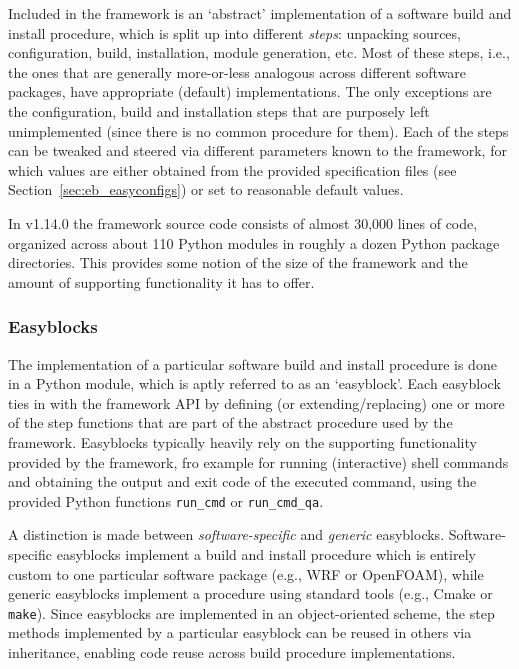 Included in the framework is an `abstract' implementation of a software build and
install procedure, which is split up into different \emph{steps}: unpacking sources,
configuration, build, installation, module generation, etc. Most of these steps,
i.e., the ones that are generally more-or-less analogous across
different software packages, have appropriate (default) implementations. The only
exceptions are the configuration, build and installation steps that are purposely
left unimplemented (since there is no common procedure for them). Each of the steps
can be tweaked and steered via different parameters known to the framework, for
which values are either obtained from the provided specification files (see
Section~\ref{sec:eb_easyconfigs}) or set to reasonable default values.

In \easybuild{} v1.14.0 the framework source code consists of almost 30,000 lines
of code, organized across about 110 Python modules in roughly a dozen Python
package directories. This provides some notion of the size of the \easybuild{}
framework and the amount of supporting functionality it has to offer.

\subsubsection{Easyblocks}
\label{sec:eb_easyblocks}

The implementation of a particular software build and install procedure is done in
a Python module, which is aptly referred to as an `easyblock'. Each easyblock
ties in with the framework API by defining (or extending/replacing) one or more of
the step functions that are part of the abstract procedure used by the
\easybuild{} framework. Easyblocks typically heavily rely on the supporting
functionality provided by the framework, fro example for running (interactive) shell
commands and obtaining the output and exit code of the executed command, using the
provided Python functions \texttt{\small run\_cmd} or \texttt{\small run\_cmd\_qa}.

A distinction is made between \emph{software-specific} and \emph{generic} easyblocks.
Software-specific easyblocks implement a build and install procedure which is
entirely custom to one particular software package (e.g., WRF or OpenFOAM), while
generic easyblocks implement a procedure using standard tools (e.g., Cmake or
\texttt{\small make}). Since easyblocks are implemented in an object-oriented scheme,
the step methods implemented by a particular easyblock can be reused in others via
inheritance, enabling code reuse across build procedure implementations.

